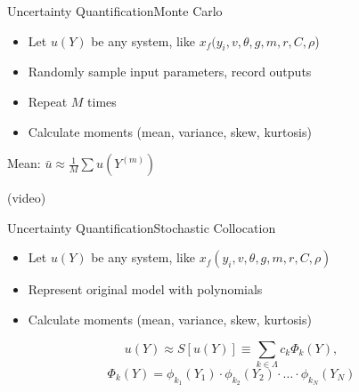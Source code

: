 \documentclass{beamer}
\begin{document}
\begin{frame}{Uncertainty Quantification}{Monte Carlo}\vspace{-30pt}
\begin{itemize}
\item Let $u(Y)$ be any system, like $x_f(y_i,v,\theta,g,m,r,C,\rho$)
\item Randomly sample input parameters, record outputs
\item Repeat $M$ times
\item Calculate moments (mean, variance, skew, kurtosis)
\end{itemize}
\centerline{Mean: $\bar u\approx\frac{1}{M}\sum u\left(Y^{(m)}\right)$}
(video)
\end{frame}

\begin{frame}{Uncertainty Quantification}{Stochastic Collocation}\vspace{-30pt}
\begin{itemize}
\item Let $u(Y)$ be any system, like $x_f(y_i,v,\theta,g,m,r,C,\rho)$
\item Represent original model with polynomials
\item Calculate moments (mean, variance, skew, kurtosis)
\end{itemize}
\begin{equation*}
u(Y)\approx S[u(Y)]\equiv\sum_{k\in\Lambda}c_k\Phi_k(Y),
\end{equation*}
\begin{equation*}
\Phi_k(Y) = \phi_{k_1}(Y_1)\cdot\phi_{k_2}(Y_2)\cdot\ldots\cdot\phi_{k_N}(Y_N)
\end{equation*}
\end{frame}
\end{document}

